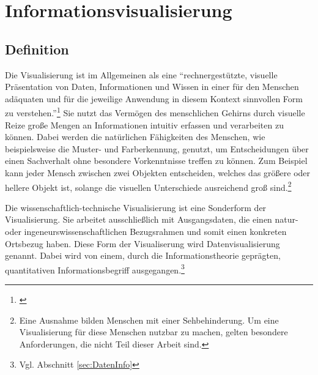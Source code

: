 \documentclass[a4paper, 
               12pt,
               DIV=calc,
               version=first,
               pdftex,
               headsepline,
               footsepline,
               bibliography=totocnumbered,
               listof=numbered]{scrreprt}
\begin{document}
\chapter{Informationsvisualisierung}
\label{cha:Informationsvisualisierung}
\section{Definition}
\label{sec:Definition}
Die Visualisierung ist im Allgemeinen als eine "`rechnergestützte, visuelle Präsentation von Daten, Informationen und Wissen
in einer für den Menschen adäquaten und für die jeweilige Anwendung in diesem Kontext sinnvollen Form
zu verstehen."'\footnote{\citep[S.\,3]{Schumann}}
Sie nutzt das Vermögen des menschlichen Gehirns durch visuelle Reize große Mengen an Informationen
intuitiv erfassen und verarbeiten zu können. Dabei werden die natürlichen Fähigkeiten des Menschen,
wie beispielsweise die Muster- und Farberkennung, genutzt, um Entscheidungen über
einen Sachverhalt ohne besondere Vorkenntnisse treffen zu können. Zum Beispiel kann jeder Mensch zwischen zwei Objekten entscheiden,
welches das größere oder hellere Objekt ist, solange die visuellen Unterschiede ausreichend groß sind.\footnote{
Eine Ausnahme bilden Menschen mit einer Sehbehinderung. Um eine Visualisierung für diese Menschen
nutzbar zu machen, gelten besondere Anforderungen, die nicht Teil dieser Arbeit sind.}

Die wissenschaftlich-technische Visualisierung ist eine Sonderform der Visualisierung. Sie arbeitet ausschließlich mit Ausgangsdaten,
die einen natur- oder ingeneurswissenschaftlichen Bezugsrahmen und somit einen konkreten Ortsbezug haben. Diese Form der
Visualiserung wird Datenvisualisierung genannt. Dabei wird von einem, durch die Informationstheorie
geprägten, quantitativen Informationsbegriff ausgegangen.\footnote{Vgl. 
Abschnitt \ref{sec:DatenInfo}}
\end{document}
